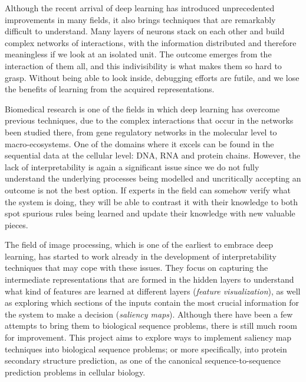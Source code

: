 Although the recent arrival of deep learning has introduced unprecedented improvements in many fields, it also brings techniques that are remarkably difficult to understand. Many layers of neurons stack on each other and build complex networks of interactions, with the information distributed and therefore meaningless if we look at an isolated unit. The outcome emerges from the interaction of them all, and this indivisibility is what makes them so hard to grasp. Without being able to look inside, debugging efforts are futile, and we lose the benefits of learning from the acquired representations.

Biomedical research is one of the fields in which deep learning has overcome previous techniques, due to the complex interactions that occur in the networks been studied there, from gene regulatory networks in the molecular level to macro-ecosystems. One of the domains where it excels can be found in the sequential data at the cellular level: DNA, RNA and protein chains. However, the lack of interpretability is again a significant issue since we do not fully understand the underlying processes being modelled and uncritically accepting an outcome is not the best option. If experts in the field can somehow verify what the system is doing, they will be able to contrast it with their knowledge to both spot spurious rules being learned and update their knowledge with new valuable pieces.

The field of image processing, which is one of the earliest to embrace deep learning, has started to work already in the development of interpretability techniques that may cope with these issues. They focus on capturing the intermediate representations that are formed in the hidden layers to understand what kind of features are learned at different layers (\textit{feature visualization}), as well as exploring which sections of the inputs contain the most crucial information for the system to make a decision (\textit{saliency maps}). Although there have been a few attempts to bring them to biological sequence problems, there is still much room for improvement. This project aims to explore ways to implement saliency map techniques into biological sequence problems; or more specifically, into protein secondary structure prediction, as one of the canonical sequence-to-sequence prediction problems in cellular biology.
